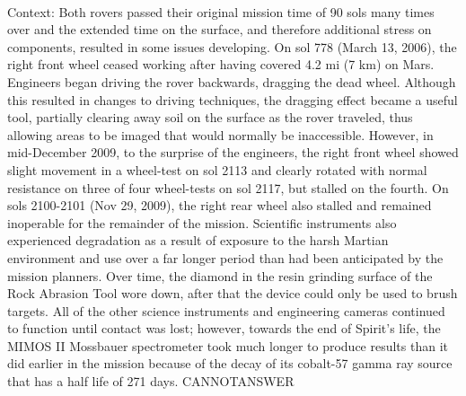 \documentclass[11pt,a4paper, onecolumn]{article}
\begin{document}
\\ Context: Both rovers passed their original mission time of 90 sols many times over and the extended time on the surface, and therefore additional stress on components, resulted in some issues developing. On sol 778 (March 13, 2006), the right front wheel ceased working after having covered 4.2 mi (7 km) on Mars. Engineers began driving the rover backwards, dragging the dead wheel. Although this resulted in changes to driving techniques, the dragging effect became a useful tool, partially clearing away soil on the surface as the rover traveled, thus allowing areas to be imaged that would normally be inaccessible. However, in mid-December 2009, to the surprise of the engineers, the right front wheel showed slight movement in a wheel-test on sol 2113 and clearly rotated with normal resistance on three of four wheel-tests on sol 2117, but stalled on the fourth. On sols 2100-2101 (Nov 29, 2009), the right rear wheel also stalled and remained inoperable for the remainder of the mission. Scientific instruments also experienced degradation as a result of exposure to the harsh Martian environment and use over a far longer period than had been anticipated by the mission planners. Over time, the diamond in the resin grinding surface of the Rock Abrasion Tool wore down, after that the device could only be used to brush targets. All of the other science instruments and engineering cameras continued to function until contact was lost; however, towards the end of Spirit's life, the MIMOS II Mossbauer spectrometer took much longer to produce results than it did earlier in the mission because of the decay of its cobalt-57 gamma ray source that has a half life of 271 days. CANNOTANSWER
\end{document}
